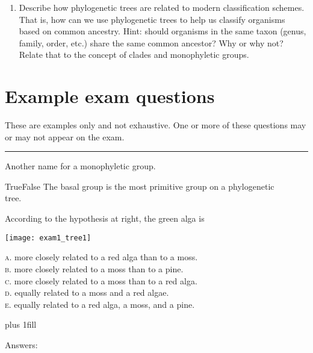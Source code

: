 \documentclass[letterpaper]{tufte-handout}
\newcommand{\answers}[1]{\hfill Answers:\marginnote{\hfill\reflectbox{#1}}}
\begin{document}
\begin{enumerate}
	\item Describe how phylogenetic trees are related  to modern classification schemes. That is, how can we use phylogenetic trees to help us classify organisms based on common ancestry. Hint: should organisms in the same taxon (genus, family, order, etc.) share the same common ancestor? Why or why not? Relate that to the concept of clades and monophyletic groups.

\end{enumerate}
\section*{Example exam questions}

These are examples only and not exhaustive. One or more of these questions may or may not appear on the exam.

\bigskip

\noindent \rule{1in}{0.4pt} Another name for a monophyletic group.

\bigskip

\noindent True\hspace{1em}False\hspace{1em} The basal group is the most primitive group on a phylogenetic  \\
\noindent {} tree.

\bigskip

\noindent According to the hypothesis at right, the green alga is

\smallskip
\begin{marginfigure}[0.75in]
	\texttt{[image: exam1\_tree1]}
\end{marginfigure}

\noindent \textsc{a}. more closely related to a red alga than to a moss.\\
\noindent \textsc{b}. more closely related to a moss than to a pine. \\
\noindent \textsc{c}. more closely related to a moss than to a red alga. \\
\noindent \textsc{d}. equally related to a moss and a red algae. \\
\noindent \textsc{e}. equally related to a red alga, a moss, and a pine.

\vskip0pt plus 1fill

\answers{Clade. False. C.}
\end{document}
